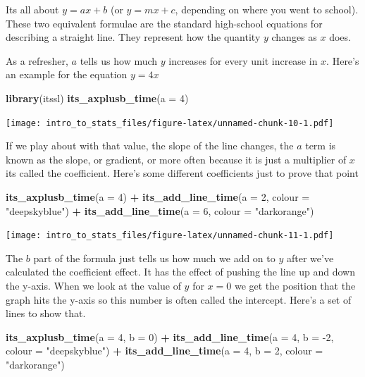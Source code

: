\documentclass[
]{book}
\newenvironment{Shaded}{\begin{snugshade}}{\end{snugshade}}
\newcommand{\DataTypeTok}[1]{\textcolor[rgb]{0.13,0.29,0.53}{#1}}
\newcommand{\DecValTok}[1]{\textcolor[rgb]{0.00,0.00,0.81}{#1}}
\newcommand{\KeywordTok}[1]{\textcolor[rgb]{0.13,0.29,0.53}{\textbf{#1}}}
\newcommand{\NormalTok}[1]{#1}
\newcommand{\OperatorTok}[1]{\textcolor[rgb]{0.81,0.36,0.00}{\textbf{#1}}}
\newcommand{\StringTok}[1]{\textcolor[rgb]{0.31,0.60,0.02}{#1}}
\begin{document}
Its all about \(y = ax + b\) (or \(y = mx + c\), depending on where you went to school). These two equivalent formulae are the standard high-school equations for describing a straight line. They represent how the quantity \(y\) changes as \(x\) does.

As a refresher, \(a\) tells us how much \(y\) increases for every unit increase in \(x\). Here's an example for the equation \(y = 4x\)

\begin{Shaded}
\begin{Highlighting}[]
\KeywordTok{library}\NormalTok{(itssl)}
\KeywordTok{its_axplusb_time}\NormalTok{(}\DataTypeTok{a =} \DecValTok{4}\NormalTok{)}
\end{Highlighting}
\end{Shaded}

\texttt{[image: intro\_to\_stats\_files/figure-latex/unnamed-chunk-10-1.pdf]}

If we play about with that value, the slope of the line changes, the \(a\) term is known as the slope, or gradient, or more often because it is just a multiplier of \(x\) its called the coefficient. Here's some different coefficients just to prove that point

\begin{Shaded}
\begin{Highlighting}[]
\KeywordTok{its_axplusb_time}\NormalTok{(}\DataTypeTok{a =} \DecValTok{4}\NormalTok{) }\OperatorTok{+}
\StringTok{  }\KeywordTok{its_add_line_time}\NormalTok{(}\DataTypeTok{a =} \DecValTok{2}\NormalTok{, }\DataTypeTok{colour =} \StringTok{"deepskyblue"}\NormalTok{) }\OperatorTok{+}
\StringTok{  }\KeywordTok{its_add_line_time}\NormalTok{(}\DataTypeTok{a =} \DecValTok{6}\NormalTok{, }\DataTypeTok{colour =} \StringTok{"darkorange"}\NormalTok{)}
\end{Highlighting}
\end{Shaded}

\texttt{[image: intro\_to\_stats\_files/figure-latex/unnamed-chunk-11-1.pdf]}

The \(b\) part of the formula just tells us how much we add on to \(y\) after we've calculated the coefficient effect. It has the effect of pushing the line up and down the y-axis. When we look at the value of \(y\) for \(x = 0\) we get the position that the graph hits the y-axis so this number is often called the intercept. Here's a set of lines to show that.

\begin{Shaded}
\begin{Highlighting}[]
\KeywordTok{its_axplusb_time}\NormalTok{(}\DataTypeTok{a =} \DecValTok{4}\NormalTok{, }\DataTypeTok{b =} \DecValTok{0}\NormalTok{) }\OperatorTok{+}\StringTok{ }
\StringTok{  }\KeywordTok{its_add_line_time}\NormalTok{(}\DataTypeTok{a =} \DecValTok{4}\NormalTok{, }\DataTypeTok{b =} \DecValTok{-2}\NormalTok{, }\DataTypeTok{colour =} \StringTok{"deepskyblue"}\NormalTok{) }\OperatorTok{+}
\StringTok{  }\KeywordTok{its_add_line_time}\NormalTok{(}\DataTypeTok{a =} \DecValTok{4}\NormalTok{, }\DataTypeTok{b =} \DecValTok{2}\NormalTok{, }\DataTypeTok{colour =} \StringTok{"darkorange"}\NormalTok{)}
\end{Highlighting}
\end{Shaded}
\end{document}
